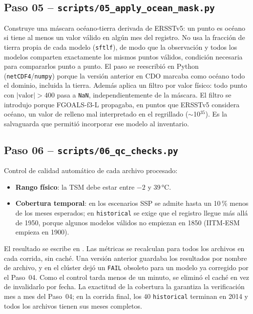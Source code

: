 \subsection{Paso 05 -- \texttt{scripts/05\_apply\_ocean\_mask.py}}
\label{sec:paso05}
Construye una máscara océano-tierra derivada de ERSSTv5: un punto es océano si tiene al menos un valor válido en algún mes del registro. No usa la fracción de tierra propia de cada modelo (\texttt{sftlf}), de modo que la observación y todos los modelos comparten exactamente los mismos puntos válidos, condición necesaria para compararlos punto a punto. El paso se reescribió en Python (\texttt{netCDF4}/\texttt{numpy}) porque la versión anterior en CDO marcaba como océano todo el dominio, incluida la tierra. Además aplica un filtro por valor físico: todo punto con $|\text{valor}| > 400$ pasa a \texttt{NaN}, independientemente de la máscara. El filtro se introdujo porque FGOALS-f3-L propagaba, en puntos que ERSSTv5 considera océano, un valor de relleno mal interpretado en el regrillado ($\sim$10$^{35}$). Es la salvaguarda que permitió incorporar ese modelo al inventario.

\subsection{Paso 06 -- \texttt{scripts/06\_qc\_checks.py}}
\label{sec:paso06}
Control de calidad automático de cada archivo procesado:
\begin{itemize}
\item \textbf{Rango físico}: la TSM debe estar entre $-2$ y 39\,°C.
\item \textbf{Cobertura temporal}: en los escenarios SSP se admite hasta un 10\,\% menos de los meses esperados; en \texttt{historical} se exige que el registro llegue más allá de 1950, porque algunos modelos válidos no empiezan en 1850 (IITM-ESM empieza en 1900).
\end{itemize}
El resultado se escribe en . Las métricas se recalculan para todos los archivos en cada corrida, sin caché. Una versión anterior guardaba los resultados por nombre de archivo, y en el clúster dejó un \texttt{FAIL} obsoleto para un modelo ya corregido por el Paso~04. Como el control tarda menos de un minuto, se eliminó el caché en vez de invalidarlo por fecha. La exactitud de la cobertura la garantiza la verificación mes a mes del Paso~04; en la corrida final, los 40 \texttt{historical} terminan en 2014 y todos los archivos tienen sus meses completos.

